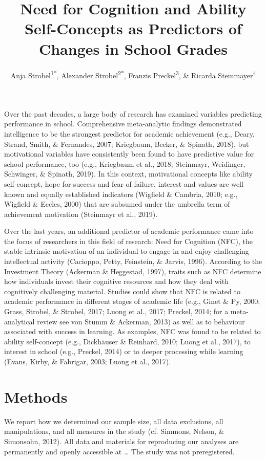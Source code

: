 \documentclass[
  man]{apa6}
\title{Need for Cognition and Ability Self-Concepts as Predictors of Changes in School Grades}
\author{Anja Strobel\textsuperscript{1*}, Alexander Strobel\textsuperscript{2*}, Franzis Preckel\textsuperscript{3}, \& Ricarda Steinmayer\textsuperscript{4}}
\date{}
\affiliation{\vspace{0.5cm}\textsuperscript{1} Department of Psychology, Chemnitz University of Technology, Chemnitz, Germany\\\textsuperscript{2} Faculty of Psychology, Technische Universität Dresden, Dresden, Germany\\\textsuperscript{3} Department of Psychology, University of Trier, Trier, Germany\\\textsuperscript{4} Department of Psychology, TU Dortmund University, Dortmund, Germany}
\begin{document}
\maketitle

Over the past decades, a large body of research has examined variables predicting performance in school. Comprehensive meta-analytic findings demonstrated intelligence to be the strongest predictor for academic achievement (e.g., Deary, Strand, Smith, \& Fernandes, 2007; Kriegbaum, Becker, \& Spinath, 2018), but motivational variables have consistently been found to have predictive value for school performance, too (e.g., Kriegbaum et al., 2018; Steinmayr, Weidinger, Schwinger, \& Spinath, 2019). In this context, motivational concepts like ability self-concept, hope for success and fear of failure, interest and values are well known and equally established indicators (Wigfield \& Cambria, 2010; e.g., Wigfield \& Eccles, 2000) that are subsumed under the umbrella term of achievement motivation (Steinmayr et al., 2019).

Over the last years, an additional predictor of academic performance came into the focus of researchers in this field of research: Need for Cognition (NFC), the stable intrinsic motivation of an individual to engage in and enjoy challenging intellectual activity (Cacioppo, Petty, Feinstein, \& Jarvis, 1996). According to the Investment Theory (Ackerman \& Heggestad, 1997), traits such as NFC determine how individuals invest their cognitive resources and how they deal with cognitively challenging material. Studies could show that NFC is related to academic performance in different stages of academic life (e.g., Ginet \& Py, 2000; Grass, Strobel, \& Strobel, 2017; Luong et al., 2017; Preckel, 2014; for a meta-analytical review see von Stumm \& Ackerman, 2013) as well as to behaviour associated with success in learning. As examples, NFC was found to be related to ability self-concept (e.g., Dickhäuser \& Reinhard, 2010; Luong et al., 2017), to interest in school (e.g., Preckel, 2014) or to deeper processing while learning (Evans, Kirby, \& Fabrigar, 2003; Luong et al., 2017).

\hypertarget{methods}{%
\section{Methods}\label{methods}}

We report how we determined our sample size, all data exclusions, all manipulations, and all measures in the study (cf. Simmons, Nelson, \& Simonsohn, 2012). All data and materials for reproducing our analyses are permanently and openly accessible at \ldots{} The study was not preregistered.
\end{document}
